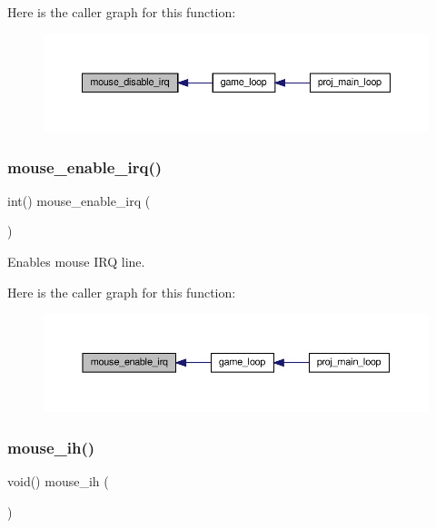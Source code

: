 Here is the caller graph for this function\+:
\nopagebreak
\begin{figure}[H]
\begin{center}
\leavevmode
\includegraphics[width=350pt]{group__mouse_gaab2e4485c75ef16ea9fbd7662bf12e23_icgraph}
\end{center}
\end{figure}
\mbox{\label{group__mouse_gab07d3648ab5a4565e55fbf0fa0904bd6}} 
\subsubsection{\texorpdfstring{mouse\+\_\+enable\+\_\+irq()}{mouse\_enable\_irq()}}
{\footnotesize\ttfamily int() mouse\+\_\+enable\+\_\+irq (\begin{DoxyParamCaption}{ }\end{DoxyParamCaption})}



Enables mouse I\+RQ line. 

Here is the caller graph for this function\+:
\nopagebreak
\begin{figure}[H]
\begin{center}
\leavevmode
\includegraphics[width=350pt]{group__mouse_gab07d3648ab5a4565e55fbf0fa0904bd6_icgraph}
\end{center}
\end{figure}
\mbox{\label{group__mouse_ga210374b50462acdedab00df64d5cea3c}} 
\subsubsection{\texorpdfstring{mouse\+\_\+ih()}{mouse\_ih()}}
{\footnotesize\ttfamily void() mouse\+\_\+ih (\begin{DoxyParamCaption}{ }\end{DoxyParamCaption})}



